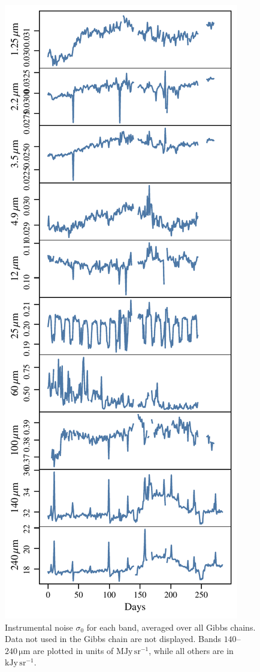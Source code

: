 \documentclass{aa}
\begin{document}
\begin{figure}
	\centering
	\includegraphics[width=\columnwidth]{figs/sigma0_bands.pdf}
	\caption{Instrumental noise $\sigma_0$ for each band, averaged over all Gibbs chains. Data not used in the Gibbs chain are not displayed. Bands $140$--$240\,\mathrm{\mu m}$ are plotted in units of $\mathrm{MJy\,sr^{-1}}$, while all others are in $\mathrm{kJy\,sr^{-1}}$.}
	\label{fig:sigma0}
\end{figure}
\end{document}
